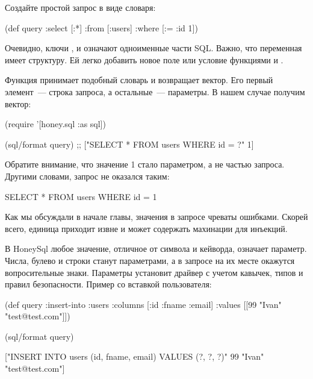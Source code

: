 \begin{english}
  \begin{clojure}
  \end{clojure}
\end{english}

Создайте простой запрос в виде словаря:

\begin{english}
  \begin{clojure}
(def query
  {:select [:*]
   :from [:users]
   :where [:= :id 1]})
  \end{clojure}
\end{english}

Очевидно, ключи ,  и  означают одноименные части SQL. Важно, что переменная  имеет структуру. Ей легко добавить новое поле или условие функциями  и .

Функция  принимает подобный словарь и возвращает вектор. Его первый элемент~--- строка запроса, а остальные~--- параметры. В нашем случае получим вектор:

\begin{english}
  \begin{clojure}
(require '[honey.sql :as sql])

(sql/format query)
;; ["SELECT * FROM users WHERE id = ?" 1]
  \end{clojure}
\end{english}

Обратите внимание, что значение 1 стало параметром, а не частью запроса. Другими словами, запрос не оказался таким:

\begin{english}
  \begin{sql}
SELECT * FROM users WHERE id = 1
  \end{sql}
\end{english}

Как мы обсуждали в начале главы, значения в запросе чреваты ошибками. Скорей всего, единица приходит извне и может содержать махинации для инъекций.

В HoneySql любое значение, отличное от символа и кейворда, означает параметр. Числа, булево и строки станут параметрами, а в запросе на их месте окажутся вопросительные знаки. Параметры установит драйвер с учетом кавычек, типов и правил безопасности. Пример со вставкой пользователя:

\begin{english}
  \begin{clojure}
(def query
  {:insert-into :users
   :columns [:id :fname :email]
   :values [[99 "Ivan" "test@test.com"]]})

(sql/format query)

["INSERT INTO users (id, fname, email)
  VALUES (?, ?, ?)"
 99
 "Ivan"
 "test@test.com"]
  \end{clojure}
\end{english}


